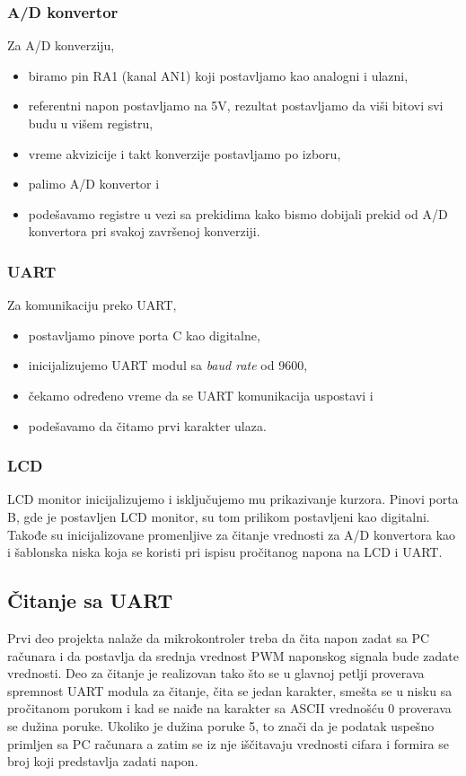 \documentclass{report}
\begin{document}
            \subsubsection*{A/D konvertor}
                Za A/D konverziju,
                \begin{itemize}
                    \item biramo pin RA1 (kanal AN1) koji postavljamo kao analogni i ulazni,
                    \item referentni napon postavljamo na 5V, rezultat postavljamo da viši bitovi svi budu u višem registru,
                    \item vreme akvizicije i takt konverzije postavljamo po izboru,
                    \item palimo A/D konvertor i
                    \item podešavamo registre u vezi sa prekidima kako bismo dobijali prekid od A/D konvertora pri svakoj završenoj konverziji.
                \end{itemize}
            \subsubsection*{UART}
                Za komunikaciju preko UART,
                \begin{itemize}
                    \item postavljamo pinove porta C kao digitalne,
                    \item inicijalizujemo UART modul sa \textit{baud rate} od 9600,
                    \item čekamo određeno vreme da se UART komunikacija uspostavi i
                    \item podešavamo da čitamo prvi karakter ulaza.
                \end{itemize}
            \subsubsection*{LCD}
                LCD monitor inicijalizujemo i isključujemo mu prikazivanje kurzora. Pinovi porta B, gde je postavljen LCD monitor, su tom prilikom postavljeni kao digitalni. Takođe su inicijalizovane promenljive za čitanje vrednosti za A/D konvertora kao i šablonska niska koja se koristi pri ispisu pročitanog napona na LCD i UART.
        \subsection*{Čitanje sa UART}
            Prvi deo projekta nalaže da mikrokontroler treba da čita napon zadat sa PC računara i da postavlja da srednja vrednost PWM naponskog signala bude zadate vrednosti. Deo za čitanje je realizovan tako što se u glavnoj petlji proverava spremnost UART modula za čitanje, čita se jedan karakter, smešta se u nisku sa pročitanom porukom i kad se naiđe na karakter sa ASCII vrednošću 0 proverava se dužina poruke. Ukoliko je dužina poruke 5, to znači da je podatak uspešno primljen sa PC računara a zatim se iz nje iščitavaju vrednosti cifara i formira se broj koji predstavlja zadati napon.
\end{document}
